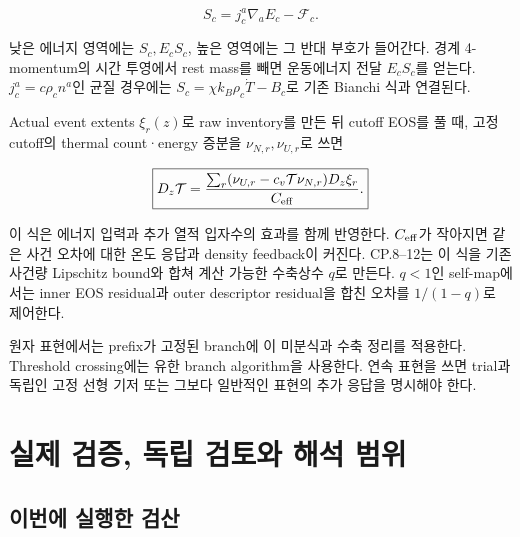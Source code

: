 \[
\boxed{S_c=j_c^a\nabla_aE_c-\mathcal F_c.}
\]

낮은 에너지 영역에는 \(S_c,E_cS_c\), 높은 영역에는 그 반대 부호가 들어간다. 경계 4-momentum의 시간 투영에서 rest mass를 빼면 운동에너지 전달 \(E_cS_c\)를 얻는다. \(j_c^a=c\rho_cn^a\)인 균질 경우에는 \(S_c=\chi k_B\rho_c\dot T-B_c\)로 기존 Bianchi 식과 연결된다.

Actual event extents \(\xi_r(z)\)로 raw inventory를 만든 뒤 cutoff EOS를 풀 때, 고정 cutoff의 thermal count·energy 증분을 \(\nu_{N,r},\nu_{U,r}\)로 쓰면

\[
\boxed{D_z\mathcal T=
\frac{\sum_r(\nu_{U,r}-c_v\mathcal T\nu_{N,r})D_z\xi_r}{C_{\rm eff}}.}
\]

이 식은 에너지 입력과 추가 열적 입자수의 효과를 함께 반영한다. \(C_{\rm eff}\)가 작아지면 같은 사건 오차에 대한 온도 응답과 density feedback이 커진다. CP.8--12는 이 식을 기존 사건량 Lipschitz bound와 합쳐 계산 가능한 수축상수 \(q\)로 만든다. \(q<1\)인 self-map에서는 inner EOS residual과 outer descriptor residual을 합친 오차를 \(1/(1-q)\)로 제어한다.

원자 표현에서는 prefix가 고정된 branch에 이 미분식과 수축 정리를 적용한다. Threshold crossing에는 유한 branch algorithm을 사용한다. 연속 표현을 쓰면 trial과 독립인 고정 선형 기저 또는 그보다 일반적인 표현의 추가 응답을 명시해야 한다.

\hypertarget{uxc2e4uxc81c-uxac80uxc99d-uxb3c5uxb9bd-uxac80uxd1a0uxc640-uxd574uxc11d-uxbc94uxc704}{%
\section{실제 검증, 독립 검토와 해석 범위}\label{uxc2e4uxc81c-uxac80uxc99d-uxb3c5uxb9bd-uxac80uxd1a0uxc640-uxd574uxc11d-uxbc94uxc704}}

\hypertarget{uxc774uxbc88uxc5d0-uxc2e4uxd589uxd55c-uxac80uxc0b0}{%
\subsection{이번에 실행한 검산}\label{uxc774uxbc88uxc5d0-uxc2e4uxd589uxd55c-uxac80uxc0b0}}

